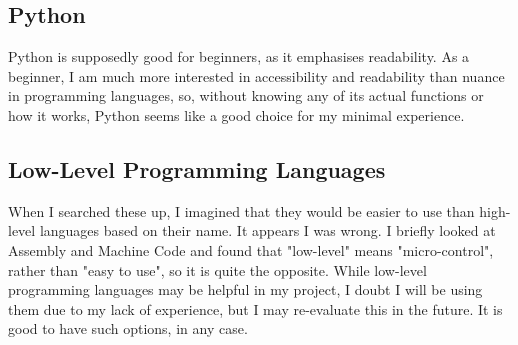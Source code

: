 \documentclass{article}
\begin{document}
\subsection{Python}
Python is supposedly good for beginners, as it emphasises readability. As a beginner, I am much more interested in accessibility and readability than nuance in programming languages, so, without knowing any of its actual functions or how it works, Python seems like a good choice for my minimal experience.

\subsection{Low-Level Programming Languages}
When I searched these up, I imagined that they would be easier to use than high-level languages based on their name. It appears I was wrong. I briefly looked at Assembly and Machine Code and found that "low-level" means "micro-control", rather than "easy to use", so it is quite the opposite. While low-level programming languages may be helpful in my project, I doubt I will be using them due to my lack of experience, but I may re-evaluate this in the future. It is good to have such options, in any case.
\end{document}
